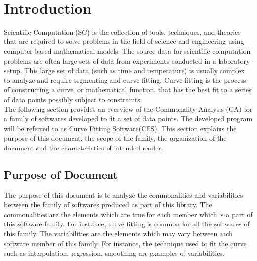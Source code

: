 \documentclass[12pt]{article}
\newcommand{\famname}{CFS} %
\begin{document}
\newpage

\tableofcontents

~\newpage


\section{Introduction}

Scientific Computation (SC) is the collection of tools, techniques, and theories that are required to solve problems in the field of science and engineering using computer-based mathematical models. The source data for scientific computation problems are often large sets of data from experiments conducted in a laboratory setup. This large set of data (such as time and temperature) is usually complex to analyze and require segmenting and curve-fitting. Curve fitting is the process of constructing a curve, or mathematical function, that has the best fit to a series of data points possibly subject to constraints.\\

The following section provides an overview of the Commonality Analysis (CA) for a family of softwares developed to fit a set of data points. The developed program will be referred to as Curve Fitting Software(\famname{}). This section explains the purpose of this document, the scope of the family, the organization of the document and the characteristics of intended reader.
 

\subsection{Purpose of Document}
The purpose of this document is to analyze the commonalities and variabilities between the family of softwares produced as part of this library. The commonalities are the elements which are true for each member which is a part of this software family. For instance, curve fitting is common for all the softwares of this family. The variabilities are the elements which may vary between each software member of this family. For instance, the technique used to fit the curve such as interpolation, regression, smoothing are examples of variabilities.
\end{document}
